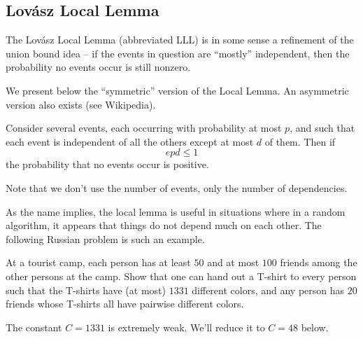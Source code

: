 \documentclass[11pt]{scrartcl}
\begin{document}
\subsection{Lov\'asz Local Lemma}
The Lov\'asz Local Lemma (abbreviated LLL)
is in some sense a refinement of the union bound idea -- if the events in question
are ``mostly'' independent, then the probability no events occur is still nonzero.

We present below the ``symmetric'' version of the Local Lemma.
An asymmetric version also exists (see Wikipedia).
\begin{theorem}
  Consider several events, each occurring with probability at most $p$,
  and such that each event is independent of all the others except at most $d$ of them.
  Then if \[ epd \le 1 \] the probability that no events occur is positive.
\end{theorem}
Note that we don't use the number of events, only the number of dependencies.

As the name implies, the local lemma is useful in situations where in a random algorithm,
it appears that things do not depend much on each other.
The following Russian problem is such an example.

\begin{example}
  [Russia 2006] At a tourist camp, each person has at least $50$ and at most $100$ friends among the other persons at the camp.
  Show that one can hand out a T-shirt to every person such that the T-shirts have (at most) $1331$ different colors,
  and any person has $20$ friends whose T-shirts all have pairwise different colors.
\end{example}

The constant $C = 1331$ is extremely weak. We'll reduce it to $C = 48$ below.
\end{document}
